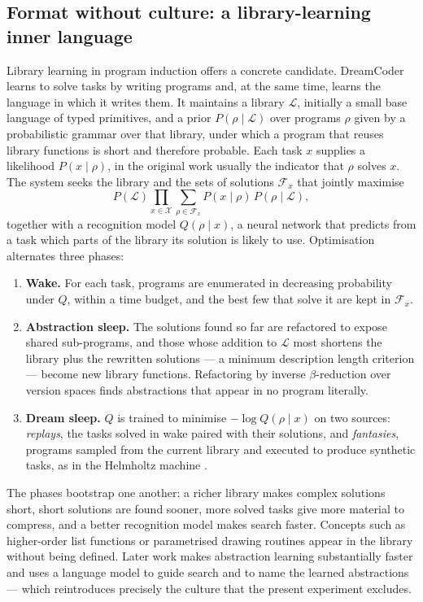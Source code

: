 \subsection{Format without culture: a library-learning inner language}
\label{sec:inner_speech:library}

Library learning in program induction offers a concrete candidate. DreamCoder \cite{ellis2021dreamcoder} learns to
solve tasks by writing programs and, at the same time, learns the language in which it writes them. It maintains a
library $\mathcal{L}$, initially a small base language of typed primitives, and a prior $P(\rho \mid \mathcal{L})$
over programs $\rho$ given by a probabilistic grammar over that library, under which a program that reuses library
functions is short and therefore probable. Each task $x$ supplies a likelihood $P(x \mid \rho)$, in the original
work usually the indicator that $\rho$ solves $x$. The system seeks the library and the sets of solutions
$\mathcal{F}_x$ that jointly maximise
\begin{equation}
    P(\mathcal{L}) \prod_{x \in \mathcal{X}} \sum_{\rho \in \mathcal{F}_x} P(x \mid \rho)\, P(\rho \mid \mathcal{L}),
    \label{eq:dc_objective}
\end{equation}
together with a recognition model $Q(\rho \mid x)$, a neural network that predicts from a task which parts of the
library its solution is likely to use. Optimisation alternates three phases:
\begin{enumerate}
    \item \textbf{Wake.} For each task, programs are enumerated in decreasing probability under $Q$, within a time
    budget, and the best few that solve it are kept in $\mathcal{F}_x$.
    \item \textbf{Abstraction sleep.} The solutions found so far are refactored to expose shared sub-programs, and
    those whose addition to $\mathcal{L}$ most shortens the library plus the rewritten solutions --- a minimum
    description length criterion --- become new library functions. Refactoring by inverse $\beta$-reduction over
    version spaces finds abstractions that appear in no program literally.
    \item \textbf{Dream sleep.} $Q$ is trained to minimise $-\log Q(\rho \mid x)$ on two sources: \emph{replays}, the
    tasks solved in wake paired with their solutions, and \emph{fantasies}, programs sampled from the current
    library and executed to produce synthetic tasks, as in the Helmholtz machine \cite{dayan1995helmholtz}.
\end{enumerate}
The phases bootstrap one another: a richer library makes complex solutions short, short solutions are found
sooner, more solved tasks give more material to compress, and a better recognition model makes search faster.
Concepts such as higher-order list functions or parametrised drawing routines appear in the library without being
defined. Later work makes abstraction learning substantially faster \cite{bowers2023stitch} and uses a language
model to guide search and to name the learned abstractions \cite{grand2024lilo} --- which reintroduces precisely the
culture that the present experiment excludes.

